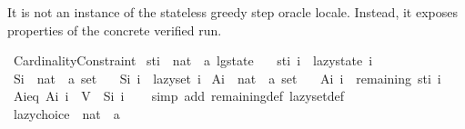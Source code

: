 \begin{isabellebody}
\begin{isamarkuptext}
  It is not an instance of the stateless greedy step oracle locale.
  Instead, it exposes properties of the concrete verified run.%
\end{isamarkuptext}\isamarkuptrue%
\isamarkupfalse%
\ Cardinality{\isacharunderscore}{\kern0pt}Constraint\isanewline
{}\isanewline
\isanewline
{}\isamarkupfalse%
\ st{\isacharunderscore}{\kern0pt}i\ {\isacharcolon}{\kern0pt}{\isacharcolon}{\kern0pt}\ {\isachardoublequoteopen}nat\ {\isasymRightarrow}\ {\isacharprime}{\kern0pt}a\ lg{\isacharunderscore}{\kern0pt}state{\isachardoublequoteclose}\ \isanewline
\ \ {\isachardoublequoteopen}st{\isacharunderscore}{\kern0pt}i\ i\ {\isasymequiv}\ lazy{\isacharunderscore}{\kern0pt}state\ i{\isachardoublequoteclose}\isanewline
\isanewline
{}\isamarkupfalse%
\ S{\isacharunderscore}{\kern0pt}i\ {\isacharcolon}{\kern0pt}{\isacharcolon}{\kern0pt}\ {\isachardoublequoteopen}nat\ {\isasymRightarrow}\ {\isacharprime}{\kern0pt}a\ set{\isachardoublequoteclose}\ \isanewline
\ \ {\isachardoublequoteopen}S{\isacharunderscore}{\kern0pt}i\ i\ {\isasymequiv}\ lazy{\isacharunderscore}{\kern0pt}set\ i{\isachardoublequoteclose}\isanewline
\isanewline
{}\isamarkupfalse%
\ A{\isacharunderscore}{\kern0pt}i\ {\isacharcolon}{\kern0pt}{\isacharcolon}{\kern0pt}\ {\isachardoublequoteopen}nat\ {\isasymRightarrow}\ {\isacharprime}{\kern0pt}a\ set{\isachardoublequoteclose}\ \isanewline
\ \ {\isachardoublequoteopen}A{\isacharunderscore}{\kern0pt}i\ i\ {\isasymequiv}\ remaining\ {\isacharparenleft}{\kern0pt}st{\isacharunderscore}{\kern0pt}i\ i{\isacharparenright}{\kern0pt}{\isachardoublequoteclose}\isanewline
\isanewline
{}\isamarkupfalse%
\ A{\isacharunderscore}{\kern0pt}i{\isacharunderscore}{\kern0pt}eq{\isacharcolon}{\kern0pt}\ {\isachardoublequoteopen}A{\isacharunderscore}{\kern0pt}i\ i\ {\isacharequal}{\kern0pt}\ V\ {\isacharminus}{\kern0pt}\ S{\isacharunderscore}{\kern0pt}i\ i{\isachardoublequoteclose}\isanewline
%
\isadelimproof
\ \ %
\endisadelimproof
%
\isatagproof
{}\isamarkupfalse%
\ {\isacharparenleft}{\kern0pt}simp\ add{\isacharcolon}{\kern0pt}\ remaining{\isacharunderscore}{\kern0pt}def\ lazy{\isacharunderscore}{\kern0pt}set{\isacharunderscore}{\kern0pt}def{\isacharparenright}{\kern0pt}%
\endisatagproof
{\isafoldproof}%
%
\isadelimproof
\isanewline
%
\endisadelimproof
\isanewline
{}\isamarkupfalse%
\ lazy{\isacharunderscore}{\kern0pt}choice\ {\isacharcolon}{\kern0pt}{\isacharcolon}{\kern0pt}\ {\isachardoublequoteopen}nat\ {\isasymRightarrow}\ {\isacharprime}{\kern0pt}a{\isachardoublequoteclose}\ \isanewline

\end{isabellebody}
